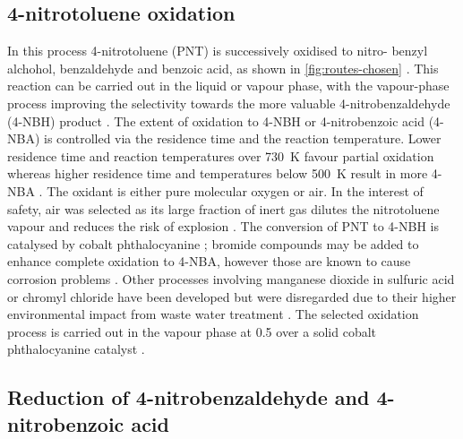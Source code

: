 
\subsection{4-nitrotoluene oxidation}

In this process 4-nitrotoluene (PNT) is successively oxidised to nitro- benzyl alchohol, benzaldehyde and benzoic acid, as shown in \cref{fig:routes-chosen} \cite{hoorn_modelling_2005}. This reaction can be carried out in the liquid or vapour phase, with the vapour-phase process improving the selectivity towards the more valuable 4-nitrobenzaldehyde (4-NBH) product \cite{bruhne_benzaldehyde_2011}. 
The extent of oxidation to 4-NBH or 4-nitrobenzoic acid (4-NBA) is controlled via the residence time and the reaction temperature. Lower residence time and reaction temperatures over \SI{730}{\K} favour partial oxidation whereas higher residence time and temperatures below \SI{500}{\K} result in more 4-NBA \cite{bruhne_benzaldehyde_2011,tan_kinetic_2010}.
The oxidant is either pure molecular oxygen or air. In the interest of safety, air was selected as its large fraction of inert  gas dilutes the nitrotoluene vapour and reduces the risk of explosion \cite{bruhne_benzaldehyde_2011}. 
The conversion of PNT to 4-NBH is catalysed by cobalt phthalocyanine \cite{wendt_reaction_1986}; bromide compounds may be added to enhance complete oxidation to 4-NBA, however those are known to cause corrosion problems \cite{opgrande_benzoic_2003}.
Other processes involving manganese dioxide in sulfuric acid or chromyl chloride have been developed but were disregarded due to their higher environmental impact from waste water treatment \cite{bruhne_benzaldehyde_2011}.
The selected oxidation process is carried out in the vapour phase at \SI{0.5}{\atm} over a solid cobalt phthalocyanine catalyst \cite{chandalia_kinetics_1999}. 


\subsection{Reduction of 4-nitrobenzaldehyde and 4-nitrobenzoic acid}

